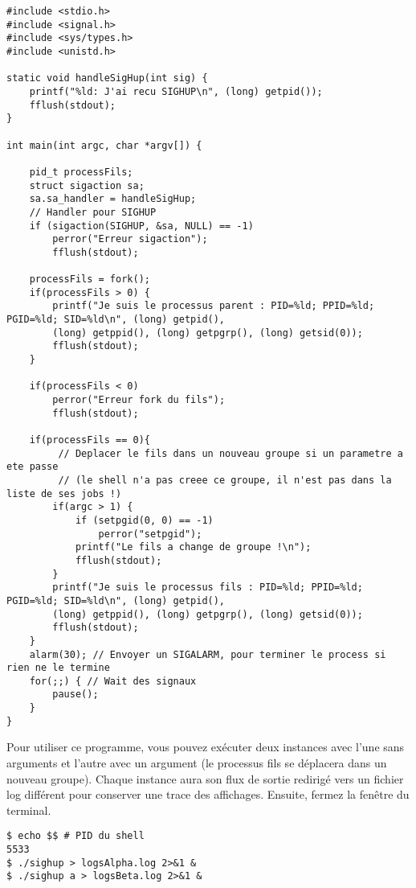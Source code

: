 \begin{lstlisting}[caption={sighup.c}, label={sighup.c}]
#include <stdio.h>
#include <signal.h>
#include <sys/types.h>
#include <unistd.h>

static void handleSigHup(int sig) {
    printf("%ld: J'ai recu SIGHUP\n", (long) getpid());
    fflush(stdout);
}

int main(int argc, char *argv[]) {

    pid_t processFils;
    struct sigaction sa;
    sa.sa_handler = handleSigHup;
    // Handler pour SIGHUP
    if (sigaction(SIGHUP, &sa, NULL) == -1)
        perror("Erreur sigaction");
        fflush(stdout);

    processFils = fork();
    if(processFils > 0) {
        printf("Je suis le processus parent : PID=%ld; PPID=%ld; PGID=%ld; SID=%ld\n", (long) getpid(),
        (long) getppid(), (long) getpgrp(), (long) getsid(0));
        fflush(stdout);
    }

    if(processFils < 0)
        perror("Erreur fork du fils");
        fflush(stdout);

    if(processFils == 0){  
         // Deplacer le fils dans un nouveau groupe si un parametre a ete passe
         // (le shell n'a pas creee ce groupe, il n'est pas dans la liste de ses jobs !)    
        if(argc > 1) {
            if (setpgid(0, 0) == -1)
                perror("setpgid");
            printf("Le fils a change de groupe !\n");
            fflush(stdout);
        }
        printf("Je suis le processus fils : PID=%ld; PPID=%ld; PGID=%ld; SID=%ld\n", (long) getpid(),
        (long) getppid(), (long) getpgrp(), (long) getsid(0));
        fflush(stdout);
    }
    alarm(30); // Envoyer un SIGALARM, pour terminer le process si rien ne le termine
    for(;;) { // Wait des signaux
        pause();
    }
}
\end{lstlisting}

Pour utiliser ce programme, vous pouvez exécuter deux instances avec l'une sans arguments et l'autre avec un argument (le processus fils se déplacera dans un nouveau groupe). 
Chaque instance aura son flux de sortie redirigé vers un fichier log différent pour conserver une trace des affichages. Ensuite, fermez la fenêtre du terminal.

\begin{lstlisting}[style=blackstyle]
$ echo $$ # PID du shell
5533
$ ./sighup > logsAlpha.log 2>&1 &
$ ./sighup a > logsBeta.log 2>&1 &
\end{lstlisting}

